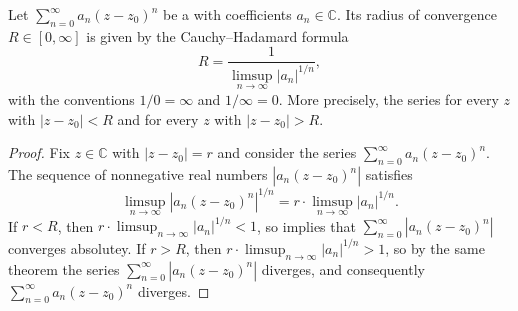 \begin{proposition} \label{proposition:cauchy_hadamard_formula_for_radius_of_convergence_for_power_series_in_one_complex_variable}
    Let $\sum_{n=0}^\infty a_n (z - z_0)^n$ be a  with coefficients $a_n \in \mathbb{C}$. Its radius of convergence $R \in [0, \infty]$ is given by the Cauchy--Hadamard formula
    $$R = \frac{1}{\limsup_{n \to \infty} |a_n|^{1/n}},$$
    with the conventions $1/0 = \infty$ and $1/\infty = 0$. More precisely, the series  for every $z$ with $|z - z_0| < R$ and  for every $z$ with $|z - z_0| > R$.
\end{proposition}

\begin{proof}
    Fix $z \in \mathbb{C}$ with $|z - z_0| = r$ and consider the series $\sum_{n=0}^\infty a_n (z - z_0)^n$. The sequence of nonnegative real numbers $|a_n (z - z_0)^n|$ satisfies
    $$\limsup_{n \to \infty} |a_n (z - z_0)^n|^{1/n} = r \cdot \limsup_{n \to \infty} |a_n|^{1/n}.$$
    If $r < R$, then $r \cdot \limsup_{n \to \infty} |a_n|^{1/n} < 1$, so  implies that $\sum_{n=0}^\infty |a_n (z - z_0)^n|$ converges absolutey. If $r > R$, then $r \cdot \limsup_{n \to \infty} |a_n|^{1/n} > 1$, so by the same theorem the series $\sum_{n=0}^\infty |a_n (z - z_0)^n|$ diverges, and consequently $\sum_{n=0}^\infty a_n (z - z_0)^n$ diverges.
\end{proof}